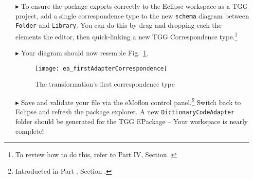 \begin{itemize}

\item[$\blacktriangleright$] To ensure the package exports correctly to the Eclipse workspace as a TGG project, add a single correspondence type to the
new \texttt{schema} diagram between \texttt{Folder} and \texttt{Library}. You can do this by drag-and-dropping each the elements the editor, then
quick-linking a new TGG Correspondence type.\footnote{To review how to do this, refer to Part IV, Section \update.} 

\vspace{0.5cm}

\item[$\blacktriangleright$] Your diagram should now resemble Fig.~\ref{ea:firstCorrType}.

\vspace{0.5cm}

\begin{figure}[htpb]
\begin{center}
  \texttt{[image: ea\_firstAdapterCorrespondence]}
  \caption{The transformation's first correspondence type}
  \label{ea:firstCorrType}
\end{center}
\end{figure}

\vspace{0.5cm}

\item[$\blacktriangleright$] Save and validate your file via the eMoflon control panel.\footnote{Introducted in Part \update, Section \update.} Switch back
to Eclipse and refresh the package explorer. A new \texttt{Dict\-ion\-ary\-Code\-Adap\-ter} folder should be generated for the TGG EPackage -- Your
workspace is nearly complete!


\end{itemize}
